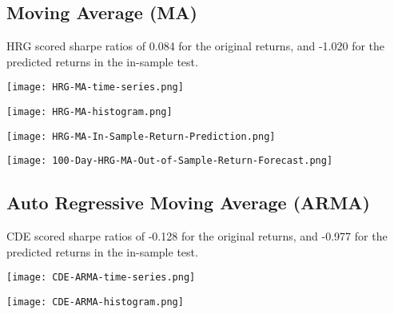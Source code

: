 \subsection{Moving Average (MA)}

HRG scored sharpe ratios of 0.084 for the original returns, and -1.020 for the predicted returns in the in-sample test.

\begin{center}  
    \texttt{[image: HRG-MA-time-series.png]}
    \label{fig:nonfloat}
\end{center}

\begin{center}  
    \texttt{[image: HRG-MA-histogram.png]}
    \label{fig:nonfloat}
\end{center}

\begin{center}
    \texttt{[image: HRG-MA-In-Sample-Return-Prediction.png]}
    \label{fig:nonfloat}
\end{center}

\begin{center}
    \texttt{[image: 100-Day-HRG-MA-Out-of-Sample-Return-Forecast.png]}
    \label{fig:nonfloat}
\end{center}

\subsection{Auto Regressive Moving Average (ARMA)}

CDE scored sharpe ratios of -0.128 for the original returns, and -0.977 for the predicted returns in the in-sample test.

\begin{center}
    \texttt{[image: CDE-ARMA-time-series.png]}
    \label{fig:nonfloat}
\end{center}

\begin{center}
    \texttt{[image: CDE-ARMA-histogram.png]}
    \label{fig:nonfloat}
\end{center}

